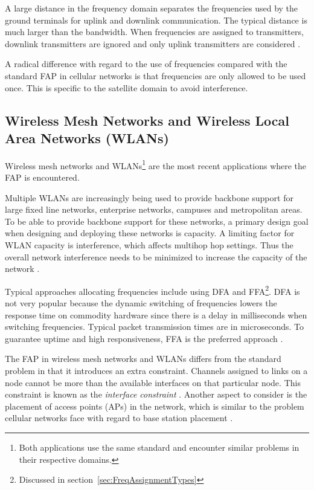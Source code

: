  A large distance in the frequency domain separates the frequencies used by the ground terminals for uplink and downlink communication. The typical distance is much larger than the bandwidth. When frequencies are assigned to transmitters, downlink transmitters are ignored and only uplink transmitters are considered \cite{Karen2004}. 

A radical difference with regard to the use of frequencies compared with the standard \gls{FAP} in cellular networks is that frequencies are only allowed to be used once\cite{Karen2004}. This is specific to the satellite domain to avoid interference\cite{Karen2004}.

\subsection{Wireless Mesh Networks and Wireless Local Area Networks (WLANs)}
Wireless mesh networks and WLANs\footnote{Both applications use the same standard and encounter similar problems in their respective domains.} are the most recent applications where the \gls{FAP} is encountered. 

Multiple WLANs are increasingly being used to provide backbone support for large fixed line networks, enterprise networks, campuses and metropolitan areas\cite{MultiradioMeshNetworks}. To be able to provide backbone support for these networks, a primary design goal when designing and deploying these networks is capacity\cite{MultiradioMeshNetworks}. A limiting factor for WLAN capacity is interference, which affects multihop hop settings. Thus the overall network interference needs to be minimized to increase the capacity of the network \cite{MultiradioMeshNetworks}. 

Typical approaches allocating frequencies include using \gls{DFA} and \gls{FFA}\footnote{Discussed in section~\ref{sec:FreqAssignmentTypes}}. \gls{DFA} is not very popular because the dynamic switching of frequencies lowers the response time on commodity hardware since there is a delay in milliseconds when switching frequencies. Typical packet transmission times are in microseconds. To guarantee uptime and high responsiveness, \gls{FFA} is the preferred approach \cite{MultiradioMeshNetworks}.

The \gls{FAP} in wireless mesh networks and WLANs differs from the standard problem in that it introduces an extra constraint. Channels assigned to links on a node cannot be more than the available interfaces on that particular node. This constraint is known as the \emph{interface constraint} \cite{MultiradioMeshNetworks}. Another aspect to consider is the placement of access points (APs) in the network, which is similar to the problem cellular networks face with regard to base station placement \cite{Karen2004}.

